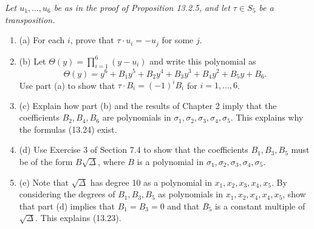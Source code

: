 \documentclass[11pt,a4paper]{article}
\newcommand{\be} {\begin{enumerate}}
\newcommand{\ee} {\end{enumerate}}
\begin{document}
{\it Let $u_1,\ldots,u_6$ be as in the proof of Proposition 13.2.5, and let $\tau \in S_5$ be a transposition.
\be
\item[(a)] For each $i$, prove that $\tau \cdot u_i = -u_j$ for some $j$.
\item[(b)] Let $\Theta(y) = \prod_{i=1}^6 (y-u_i)$ and write this polynomial as
$$\Theta(y) = y^6 + B_1 y^5 +B_2 y^4 + B_3y^3 + B_4y^2 +B_5 y + B_6.$$
Use part (a) to show that $\tau \cdot B_i = (-1)^i B_i$ for $i=1,\ldots,6$.
\item[(c)] Explain how part (b) and the results of Chapter 2 imply that the coefficients $B_2,B_4,B_6$ are polynomials in $\sigma_1,\sigma_2,\sigma_3,\sigma_4,\sigma_5$. This explains why the formulas (13.24) exist.
\item[(d)] Use Exercise 3 of Section 7.4 to show that the coefficients $B_1,B_3,B_5$ must be of the form $B \sqrt{\Delta}$, where $B$ is a polynomial in $\sigma_1,\sigma_2,\sigma_3,\sigma_4,\sigma_5$.
\item[(e)] Note that $\sqrt{\Delta}$ has degree 10 as a polynomial in $x_1,x_2,x_3,x_4,x_5$. By considering the degrees of $B_1,B_3,B_5$ as polynomials in $x_1,x_2,x_4,x_4,x_5$, show that part (d) implies that $B_1 = B_3 = 0$ and that $B_5$ is a constant multiple of $\sqrt{\Delta}$. This explains (13.23).
\ee
}
\end{document}
